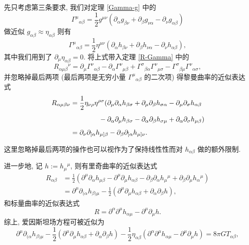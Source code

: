 先只考虑第三条要求, 我们对定理 \ref{Gamma-g} 中的
\[ \Gamma^{\mu}{}_{\alpha\beta}=\frac{1}{2}g^{\mu\nu}(\partial_{\alpha}g_{\beta\nu}+\partial_\beta g_{\nu\alpha}-\partial_\nu g_{\alpha\beta}) \] 
做近似 $g_{\alpha\beta}\approx \eta_{\alpha\beta}$ 则有
\[ \Gamma^{\mu}{}_{\alpha\beta}=\frac{1}{2}\eta^{\mu\nu}(\partial_{\alpha}h_{\beta\nu}+\partial_\beta h_{\nu\alpha}-\partial_\nu h_{\alpha\beta}), \] 
其中我们用到了 $\partial_\mu\eta_{\alpha\beta}=0$. 将上式带入定理 \ref{R-Gamma} 中的
\[ R_{\alpha\mu\beta}{}^{\nu}=\partial_{\mu}\Gamma^{\nu}{}_{\alpha\beta}-\partial_{\alpha}\Gamma^{\nu}{}_{\mu\beta}+\Gamma^{\sigma}{}_{\beta\alpha}\Gamma^{\nu}{}_{\mu\sigma}-\Gamma^{\sigma}{}_{\beta\mu}\Gamma^{\nu}{}_{\alpha\sigma}, \] 
并忽略掉最后两项 (最后两项是无穷小量 $\Gamma^{\mu}{}_{\alpha\beta}$ 的二次项) 得黎曼曲率的近似表达式
\begin{align*}
	R_{\alpha\mu\beta\nu} &= \frac{1}{2}\eta_{\nu\rho}\eta^{\rho\sigma}(\partial_\mu\partial_\alpha h_{\beta\sigma}+\partial_{\mu}\partial_\beta h_{\sigma\alpha}-\partial_\mu\partial_\sigma h_{\alpha\beta}\\
	&\phantom{\frac{1}{2}\eta_{\nu\rho}\eta^{\rho\sigma}(}\hspace{0.11em}
	-\partial_{\alpha}\partial_{\mu}h_{\beta\sigma}-\partial_{\alpha}\partial_{\beta}h_{\sigma\mu}+\partial_{\alpha}\partial_{\sigma}h_{\mu\beta})\\
	&=\partial_\nu\partial_{[\alpha}h_{\mu]\beta}-\partial_\beta\partial_{[\alpha}h_{\mu]\nu}.
\end{align*}
\begin{remark}
	这里忽略掉最后两项的操作也可以视作为了保持线性性而对 $h_{\alpha\beta}$ 做的额外限制.
\end{remark}
进一步地, 记 $h:=h_\mu{}^{\mu}$, 则有里奇曲率的近似表达式
\begin{align*}
	R_{\alpha\beta} &= \frac{1}{2} ( \partial^{\mu}\partial_{\alpha}h_{\mu\beta}-\partial^{\mu}\partial_{\mu}h_{\alpha\beta}-\partial_{\beta}\partial_{\alpha}h_{\mu}{}^{\mu}+\partial_\beta\partial_\mu h_{\alpha}{}^{\mu} )\\
	&= \partial^{\mu}\partial_{(\alpha}h_{\beta)\mu}-\frac{1}{2}( \partial^\mu\partial_\mu h_{\alpha\beta}+\partial_\alpha\partial_\beta h ),
\end{align*}
和标量曲率的近似表达式
\[ R=\partial^{\alpha}\partial^{\mu}h_{\alpha\mu}-\partial^{\mu}\partial_{\mu}h. \] 
综上, 爱因斯坦场方程可被近似为
\[ \partial^{\mu}\partial_{(\alpha}h_{\beta)\mu}-\frac{1}{2}\left( \partial^{\mu}\partial_{\mu}h_{\alpha\beta}+\partial_\alpha\partial_\beta h \right)-\frac{1}{2}\eta_{\alpha\beta}(\partial^{\alpha}\partial^{\mu}h_{\alpha\mu}-\partial^\mu\partial_\mu h)=8\pi GT_{\alpha\beta}, \] 
